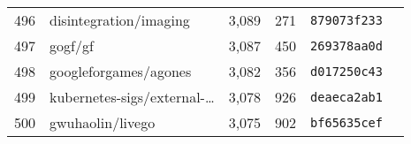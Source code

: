 {\begin{supertabular}{llrrll}
        496 &             disintegration/imaging &  3,089 &    271 &  \texttt{879073f233} &              \\
        497 &                            gogf/gf &  3,087 &    450 &  \texttt{269378aa0d} &              \\
        498 &              googleforgames/agones &  3,082 &    356 &  \texttt{d017250c43} &              \\
        499 &    kubernetes-sigs/external-\ldots &  3,078 &    926 &  \texttt{deaeca2ab1} &              \\
        500 &                   gwuhaolin/livego &  3,075 &    902 &  \texttt{bf65635cef} &              \\

    \end{supertabular}
}